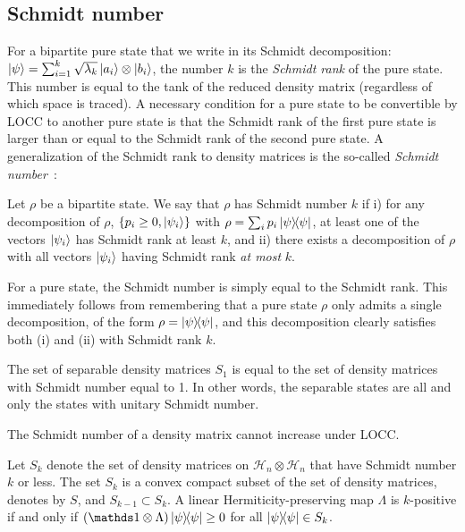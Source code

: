 \documentclass[12pt]{report}
\newcommand{\calH}{{\mathcal{H}}}
\begin{document}
\subsection{Schmidt number}
For a bipartite pure state that we write in its Schmidt decomposition:
$\ket\psi = \sum_{i=1}^k \sqrt{\lambda_k} \ket{a_i} \otimes \ket{b_i}$,
the number $k$ is the \emph{Schmidt rank} of the pure state.
This number is equal to the tank of the reduced density matrix (regardless of which space is traced).
A necessary condition for a pure state to be convertible by \ac{LOCC} to another pure state is that the Schmidt rank of the first pure state is larger than or equal to the Schmidt rank of the second pure state.
A generalization of the Schmidt rank to density matrices is the so-called \emph{Schmidt number}~\parencite{terhal2000schmidt}:
\begin{defn}
	Let $\rho$ be a bipartite state.
	We say that $\rho$ has Schmidt number $k$ if
	i) for any decomposition of $\rho$, $\{p_i \ge 0, \ket{\psi_i}\}$ with $\rho = \sum_i p_i \ketbra{\psi}$, at least one of the vectors $\ket{\psi_i}$ has Schmidt rank at least $k$,
	and ii) there exists a decomposition of $\rho$ with all vectors $\ket{\psi_i}$ having Schmidt rank \emph{at most} $k$.
\end{defn}
For a pure state, the Schmidt number is simply equal to the Schmidt rank.
This immediately follows from remembering that a pure state $\rho$ only admits a single decomposition, of the form $\rho=\ketbra{\psi}$, and this decomposition clearly satisfies both (i) and (ii) with Schmidt rank $k$.
\begin{lemma}
	The set of separable density matrices $S_1$ is equal to the set of density matrices with Schmidt number equal to 1.
	In other words, the separable states are all and only the states with unitary Schmidt number.
\end{lemma}

\begin{thm}
	The Schmidt number of a density matrix cannot increase under \ac{LOCC}.
\end{thm}

\begin{defn}
	Let $S_k$ denote the set of density matrices on $\calH_n\otimes\calH_n$ that have Schmidt number $k$ or less.
	The set $S_k$ is a convex compact subset of the set of density matrices, denotes by $S$,
	and $S_{k-1} \subset S_k$.
	A linear Hermiticity-preserving map $\Lambda$ is $k$-positive if and only if
	$(\mathds1 \otimes \Lambda)\ketbra\psi \ge 0$ for all $\ketbra\psi \in S_k$.
\end{defn}
\end{document}
